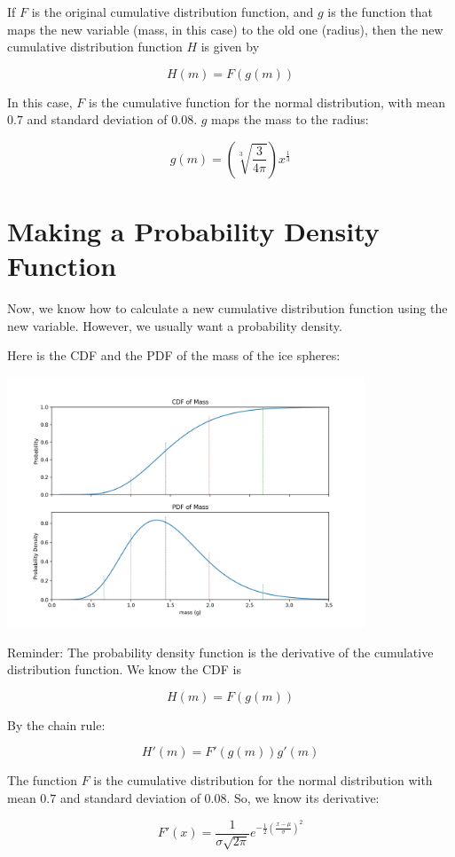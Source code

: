 If $F$ is the original cumulative distribution function, and $g$ is the function that maps the new variable (mass, in this case) to the old one (radius),  then the 
new cumulative distribution function $H$ is given by 

$$H(m) = F(g(m))$$

In this case, $F$ is the cumulative function for the normal distribution, with mean $0.7$ and standard deviation of $0.08$.  $g$ maps the mass to the radius:

$$g(m) =\left(\sqrt[3]{\frac{3}{4 \pi}}\right) x^{\frac{1}{3}}$$

\section{Making a Probability Density Function}

Now, we know how to calculate a new cumulative distribution function using the new variable.  However,  we usually want a probability density.

Here is the CDF and the PDF of the mass of the ice spheres:

\includegraphics[width=0.8\textwidth]{pdf.png}

Reminder: The probability density function is the derivative of the cumulative distribution function.    We know the CDF is

$$H(m) = F(g(m))$$

By the chain rule:

$$H'(m) = F'(g(m))g'(m)$$

The function $F$ is the cumulative distribution for the normal distribution with mean $0.7$ and standard deviation of $0.08$.  So, we know its derivative:

$$F'(x) = \frac{1}{\sigma\sqrt{2\pi}} e^{-\frac{1}{2}\left(\frac{x - \mu}{\sigma}\right)^2}$$

